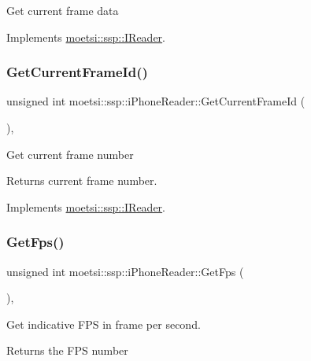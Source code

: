 Get current frame data 

Implements \hyperlink{classmoetsi_1_1ssp_1_1IReader_a357439182128e3911d77335c136035c0}{moetsi\+::ssp\+::\+I\+Reader}.

\mbox{\label{classmoetsi_1_1ssp_1_1iPhoneReader_a78792c6319743aed3ef2afc96fe16485}} 
\subsubsection{\texorpdfstring{Get\+Current\+Frame\+Id()}{GetCurrentFrameId()}}
{\footnotesize\ttfamily unsigned int moetsi\+::ssp\+::i\+Phone\+Reader\+::\+Get\+Current\+Frame\+Id (\begin{DoxyParamCaption}{ }\end{DoxyParamCaption})\hspace{0.3cm}{\ttfamily [override]}, {\ttfamily [virtual]}}

Get current frame number \begin{DoxyReturn}{Returns}
current frame number. 
\end{DoxyReturn}


Implements \hyperlink{classmoetsi_1_1ssp_1_1IReader_ac292d83eb06dee277baaa06e281a562d}{moetsi\+::ssp\+::\+I\+Reader}.

\mbox{\label{classmoetsi_1_1ssp_1_1iPhoneReader_a4bb216847a6c2ed8eb5d31788a0b8477}} 
\subsubsection{\texorpdfstring{Get\+Fps()}{GetFps()}}
{\footnotesize\ttfamily unsigned int moetsi\+::ssp\+::i\+Phone\+Reader\+::\+Get\+Fps (\begin{DoxyParamCaption}{ }\end{DoxyParamCaption})\hspace{0.3cm}{\ttfamily [override]}, {\ttfamily [virtual]}}

Get indicative F\+PS in frame per second. \begin{DoxyReturn}{Returns}
the F\+PS number 
\end{DoxyReturn}


